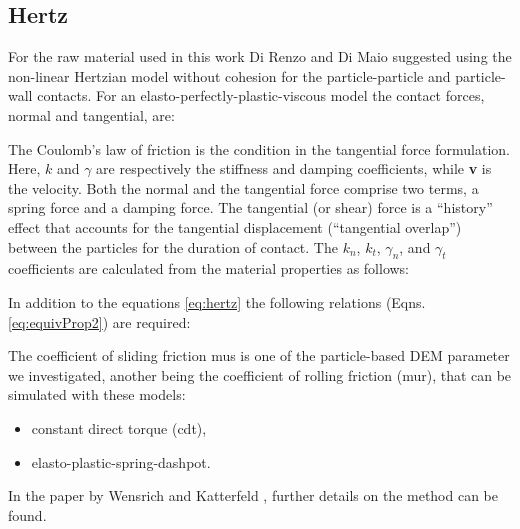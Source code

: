 \subsection{Hertz}
\label{subsec:hertz}

For the raw material used in this work 
Di Renzo and Di Maio \cite{RefWorks:145} suggested using the non-linear
Hertzian model without cohesion for the particle-particle and particle-wall contacts. 
For an elasto-perfectly-plastic-viscous model the contact forces, normal and
tangential, are:


The Coulomb's law of friction is the condition in the tangential force
formulation.
Here, $k$ and $\gamma$ are respectively the stiffness and damping coefficients, 
while \textbf{v} is the velocity.
Both the normal and the tangential
force comprise two terms, a spring force and a damping force. 
The tangential (or shear) force is a ``history'' effect that accounts for the
tangential displacement (``tangential overlap'') between the particles for the
duration of contact.
The $k_n$, $k_t$, $\gamma_n$, and $\gamma_t$ coefficients are calculated from
the material properties as follows:

In addition to the equations \ref{eq:hertz} the following relations (Eqns. \ref{eq:equivProp2}) are required:


The coefficient of sliding friction \acs{mus} is 
one of the particle-based \acs{DEM} parameter we investigated, 
another being the coefficient of rolling friction (\acs{mur}),
that can be simulated with these models:
\begin{itemize}
  \item{constant direct torque (cdt),}
  \item{elasto-plastic-spring-dashpot.}
\end{itemize}

In the paper by Wensrich and Katterfeld \cite{RefWorks:87}, further details on
the method can be found.\\



% 


